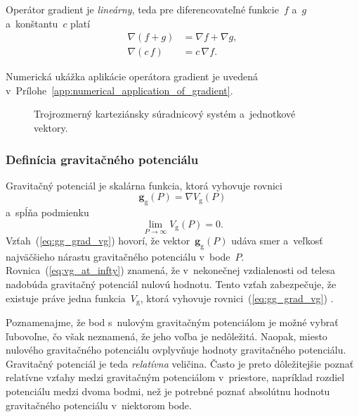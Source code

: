 \documentclass[a4paper, 12pt]{book}
\newcommand{\gidx}{\mathrm g}
\let\vec\mathbf
\begin{document}
Operátor gradient je \emph{lineárny}, teda pre diferencovateľné funkcie~$f$ 
a~$g$ a~konštantu~$c$ platí
%
\begin{align}
\label{eq:gradient_additivity}
\nabla \left(f + g \right) &= \nabla f + \nabla g{,}\\
%
\label{eq:gradient_homogenity}
\nabla (c \, f) &= c \, \nabla f{.}
\end{align}

Numerická ukážka aplikácie operátora gradient je uvedená 
v~Prílohe~\ref{app:numerical_application_of_gradient}.

\begin{figure}
\centering

\caption{Trojrozmerný karteziánsky súradnicový systém a~jednotkové vektory.}
\label{fig:3d_coord_system}
\end{figure}

\subsubsection{Definícia gravitačného potenciálu}

Gravitačný potenciál je skalárna funkcia, ktorá vyhovuje rovnici 
\parencite{SansoGeoidDetermination}
%
\begin{equation}
\label{eq:gg_grad_vg}
\vec g_\gidx(P) = \nabla V_\gidx(P)
\end{equation}
%
a~spĺňa podmienku
%
\begin{equation}
\label{eq:vg_at_infty}
\lim_{P \to \infty} V_\gidx(P) = 0{.}
\end{equation}
%
Vzťah~(\ref{eq:gg_grad_vg}) hovorí, že vektor~$\vec g_\gidx(P)$ udáva smer 
a~veľkosť najväčšieho nárastu gravitačného potenciálu v~bode~$P$.  
Rovnica~(\ref{eq:vg_at_infty}) znamená, že v~nekonečnej vzdialenosti od telesa 
nadobúda gravitačný potenciál nulovú hodnotu.  Tento vzťah zabezpečuje, že 
existuje práve jedna funkcia~$V_\gidx$, ktorá vyhovuje 
rovnici~(\ref{eq:gg_grad_vg}) \parencite{SansoGeoidDetermination}.

Poznamenajme, že bod s~nulovým gravitačným potenciálom je možné vybrať 
ľubovoľne, čo však neznamená, že jeho voľba je nedôležitá.  Naopak, miesto 
nulového gravitačného potenciálu ovplyvňuje hodnoty gravitačného potenciálu.  
Gravitačný potenciál je teda \emph{relatívna} veličina.  Často je preto 
dôležitejšie poznať relatívne vzťahy medzi gravitačným potenciálom v~priestore, 
napríklad rozdiel potenciálu medzi dvoma bodmi, než je potrebné poznať 
absolútnu hodnotu gravitačného potenciálu v~niektorom bode.
\end{document}

